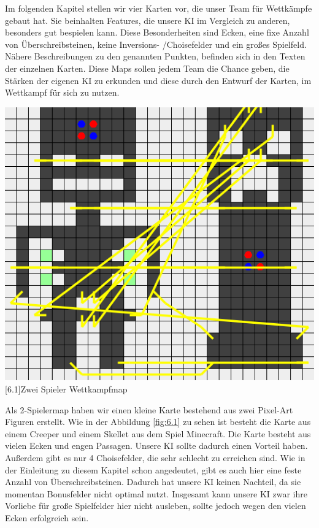 \documentclass[12pt,a4paper,bibliography=totocnumbered,listof=totocnumbered]{scrartcl}
\begin{document}
	Im folgenden Kapitel stellen wir vier Karten vor, die unser Team für Wettkämpfe gebaut hat. Sie beinhalten Features, die unsere KI im Vergleich zu anderen, besonders gut bespielen kann. Diese Besonderheiten sind Ecken, eine fixe Anzahl von Überschreibsteinen, keine Inversions- /Choisefelder und ein großes Spielfeld. Nähere Beschreibungen zu den genannten Punkten, befinden sich in den Texten der einzelnen Karten. Diese Maps sollen jedem Team die Chance geben, die Stärken der eigenen KI zu erkunden und diese durch den Entwurf der Karten, im Wettkampf für sich zu nutzen.
	
	\vspace{1em}
	\begin{minipage}{\linewidth}
		\centering
		\includegraphics[width=0.66\linewidth]{pics/Kapitel_6/CreeperMap.png}
		[6.1]{Zwei Spieler Wettkampfmap}
		\label{fig:6.1}
	\end{minipage}
	\vspace{1em}
	
	Als 2-Spielermap haben wir einen kleine Karte bestehend aus zwei Pixel-Art Figuren erstellt. Wie in der Abbildung \ref{fig:6.1} zu sehen ist besteht die Karte aus einem Creeper und einem Skellet aus dem Spiel Minecraft. Die Karte besteht aus vielen Ecken und engen Passagen. Unsere KI sollte dadurch einen Vorteil haben. Außerdem gibt es nur 4 Choisefelder, die sehr schlecht zu erreichen sind. Wie in der Einleitung zu diesem Kapitel schon angedeutet, gibt es auch hier eine feste Anzahl von Überschreibsteinen. Dadurch hat unsere KI keinen Nachteil, da sie momentan Bonusfelder nicht optimal nutzt. Insgesamt kann unsere KI zwar ihre \glqq Vorliebe \grqq{} für große Spielfelder hier nicht ausleben, sollte jedoch wegen den vielen Ecken erfolgreich sein.
	
\end{document}
